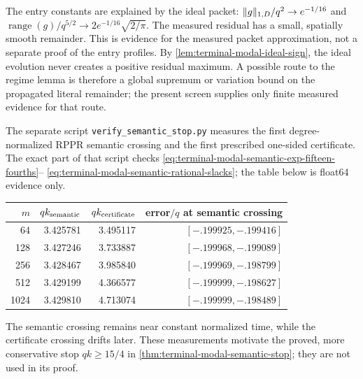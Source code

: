 The entry constants are explained by the ideal packet:
$\lVert g\rVert_{1,D}/q^2\to e^{-1/16}$ and
$\operatorname{range}(g)/q^{5/2}\to
2e^{-1/16}\sqrt{2/\pi}$.  The measured residual has a small, spatially smooth
remainder.  This is evidence for the measured packet approximation, not a
separate proof of the entry profiles.  By
\cref{lem:terminal-modal-ideal-sign}, the ideal evolution never
creates a positive residual maximum.  A possible route to the regime lemma is
therefore a global supremum or variation bound on the propagated literal
remainder; the present screen supplies only finite measured evidence for that
route.

The separate script \texttt{verify\_semantic\_stop.py} measures the first
degree-normalized RPPR semantic crossing and the first prescribed one-sided
certificate.  The exact part of that script checks
\eqref{eq:terminal-modal-semantic-exp-fifteen-fourths}--
\eqref{eq:terminal-modal-semantic-rational-slacks}; the table below is
float64 evidence only.
\begin{center}
\begin{tabular}{@{}r|rrr@{}}
$m$ & $qk_{\rm semantic}$ & $qk_{\rm certificate}$
& error$/q$ at semantic crossing\\
\hline
64   & 3.425781 & 3.495117 & $[-.199925,-.199416]$\\
128  & 3.427246 & 3.733887 & $[-.199968,-.199089]$\\
256  & 3.428467 & 3.985840 & $[-.199969,-.198799]$\\
512  & 3.429199 & 4.366577 & $[-.199999,-.198627]$\\
1024 & 3.429810 & 4.713074 & $[-.199999,-.198489]$\\
\end{tabular}
\end{center}
The semantic crossing remains near constant normalized time, while the
certificate crossing drifts later.  These measurements motivate the proved,
more conservative stop $qk\ge15/4$ in
\cref{thm:terminal-modal-semantic-stop}; they are not used in its proof.
